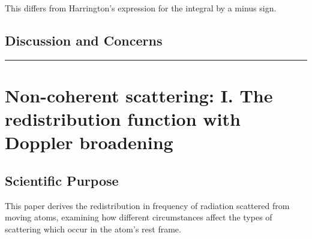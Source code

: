 \documentclass[onecolumn]{aastex63}
\begin{document}
This differs from Harrington's expression for the integral by a minus sign.

\subsection{Discussion and Concerns}



\vspace{1cm}
\hrule
\vspace{1cm}

\section{ Non-coherent scattering: I. The redistribution function with Doppler broadening}
\begin{centering}

\cite{hummer1962}

\end{centering}



\subsection{Scientific Purpose}

This paper derives the redistribution in frequency of radiation scattered from moving atoms, examining how different circumstances affect the types of scattering which occur in the atom's rest frame. 
\end{document}
